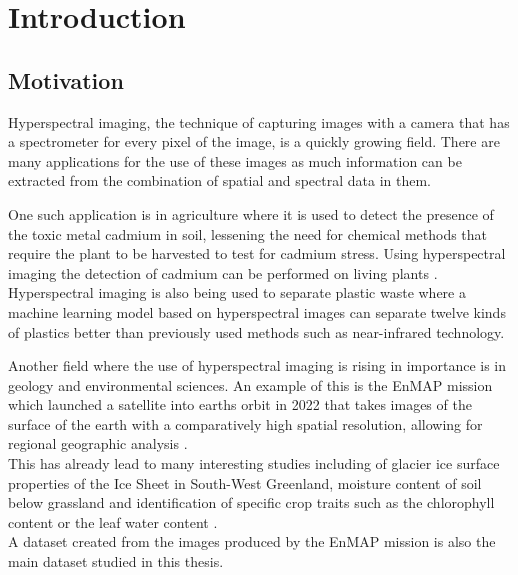 \chapter{Introduction\label{cha:chapter1}}
\section{Motivation\label{sec:moti}}

Hyperspectral imaging, the technique of capturing images with a camera that has a spectrometer for every pixel of the image, is a quickly growing field. There are many applications for the use of these images as much information can be extracted from the combination of spatial and spectral data in them.

One such application is in agriculture where it is used to detect the presence of the toxic metal cadmium in soil, lessening the need for chemical methods that require the plant to be harvested to test for cadmium stress. Using hyperspectral imaging the detection of cadmium can be performed on living plants \citep{zea_leveraging_2022}.\\
Hyperspectral imaging is also being used to separate plastic waste where a machine learning model based on hyperspectral images can separate twelve kinds of plastics better than previously used methods such as near-infrared technology\citep{henriksen_plastic_2022}.

Another field where the use of hyperspectral imaging is rising in importance is in geology and environmental sciences. An example of this is the EnMAP mission which launched a satellite into earths orbit in 2022 that takes images of the surface of the earth with a comparatively high spatial resolution, allowing for regional geographic analysis \citep{guanter_enmap_2015}.\\
This has already lead to many interesting studies including of glacier ice surface properties of the Ice Sheet in South-West Greenland, moisture content of soil below grassland and identification of specific crop traits such as the chlorophyll content or the leaf water content \citep{bohn_glacier_2022}\citep{pascual-venteo_prototyping_2022}\citep{dopper_estimating_2022}.\\
A dataset created from the images produced by the EnMAP mission is also the main dataset studied in this thesis.

